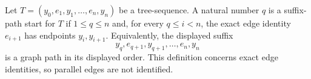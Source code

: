 \begin{definition}
Let
\(T=(y_0,e_1,y_1,\ldots,e_n,y_n)\) be a tree-sequence.  A natural
number \(q\) is a suffix-path start for \(T\) if \(1\le q\le n\) and,
for every \(q\le i<n\), the exact edge identity \(e_{i+1}\) has endpoints
\(y_i,y_{i+1}\).  Equivalently, the displayed suffix
\[
 y_q,e_{q+1},y_{q+1},\ldots,e_n,y_n
\]
is a graph path in its displayed order.  This definition concerns exact
edge identities, so parallel edges are not identified.
\end{definition}
